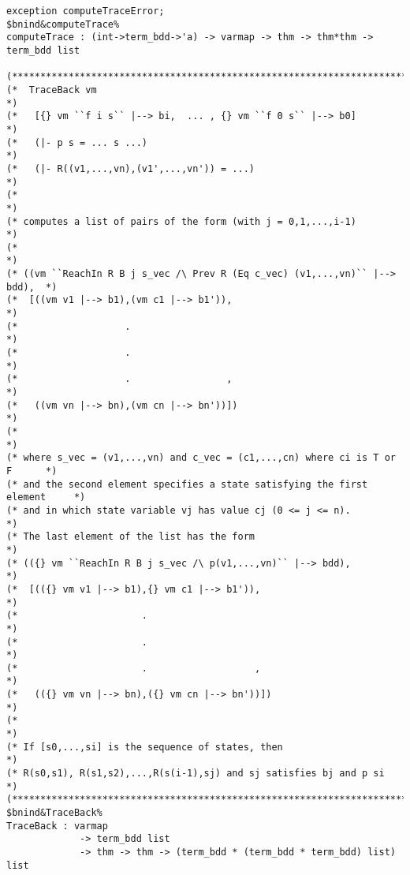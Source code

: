\documentclass[12pt]{article}
\begin{document}
\begin{footnotesize}
\begin{Verbatim}[commandchars=\$\&\%]
exception computeTraceError;
$bnind&computeTrace%
computeTrace : (int->term_bdd->'a) -> varmap -> thm -> thm*thm -> term_bdd list

(*****************************************************************************)
(*  TraceBack vm                                                             *)
(*   [{} vm ``f i s`` |--> bi,  ... , {} vm ``f 0 s`` |--> b0]               *)
(*   (|- p s = ... s ...)                                                    *)
(*   (|- R((v1,...,vn),(v1',...,vn')) = ...)                                 *)
(*                                                                           *)
(* computes a list of pairs of the form (with j = 0,1,...,i-1)               *)
(*                                                                           *)
(* ((vm ``ReachIn R B j s_vec /\ Prev R (Eq c_vec) (v1,...,vn)`` |--> bdd),  *)
(*  [((vm v1 |--> b1),(vm c1 |--> b1')),                                     *)
(*                   .                                                       *)
(*                   .                                                       *)
(*                   .                 ,                                     *)
(*   ((vm vn |--> bn),(vm cn |--> bn'))])                                    *)
(*                                                                           *)
(* where s_vec = (v1,...,vn) and c_vec = (c1,...,cn) where ci is T or F      *)
(* and the second element specifies a state satisfying the first element     *)
(* and in which state variable vj has value cj (0 <= j <= n).                *)
(* The last element of the list has the form                                 *)
(* (({} vm ``ReachIn R B j s_vec /\ p(v1,...,vn)`` |--> bdd),                *)
(*  [(({} vm v1 |--> b1),{} vm c1 |--> b1')),                                *)
(*                      .                                                    *)
(*                      .                                                    *)
(*                      .                   ,                                *)
(*   (({} vm vn |--> bn),({} vm cn |--> bn'))])                              *)
(*                                                                           *)
(* If [s0,...,si] is the sequence of states, then                            *)
(* R(s0,s1), R(s1,s2),...,R(s(i-1),sj) and sj satisfies bj and p si          *)
(*****************************************************************************)
$bnind&TraceBack%
TraceBack : varmap 
             -> term_bdd list 
             -> thm -> thm -> (term_bdd * (term_bdd * term_bdd) list) list
\end{Verbatim}
\end{footnotesize}
\end{document}

